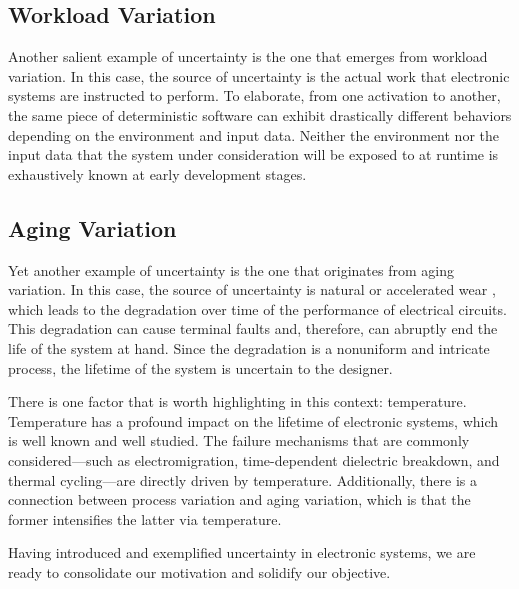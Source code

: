 \subsection{Workload Variation}

Another salient example of uncertainty is the one that emerges from workload
variation. In this case, the source of uncertainty is the actual work that
electronic systems are instructed to perform. To elaborate, from one activation
to another, the same piece of deterministic software can exhibit drastically
different behaviors depending on the environment and input data. Neither the
environment nor the input data that the system under consideration will be
exposed to at runtime is exhaustively known at early development stages.

\subsection{Aging Variation}

Yet another example of uncertainty is the one that originates from aging
variation. In this case, the source of uncertainty is natural or accelerated
wear \cite{jedec2016}, which leads to the degradation over time of the
performance of electrical circuits. This degradation can cause terminal faults
and, therefore, can abruptly end the life of the system at hand. Since the
degradation is a nonuniform and intricate process, the lifetime of the system is
uncertain to the designer.

There is one factor that is worth highlighting in this context: temperature.
Temperature has a profound impact on the lifetime of electronic systems, which
is well known and well studied. The failure mechanisms that are commonly
considered---such as electromigration, time-dependent dielectric breakdown, and
thermal cycling---are directly driven by temperature. Additionally, there is a
connection between process variation and aging variation, which is that the
former intensifies the latter via temperature.

\conclusioncut
Having introduced and exemplified uncertainty in electronic systems, we are
ready to consolidate our motivation and solidify our objective.
